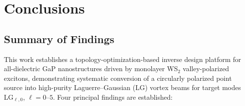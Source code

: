 \chapter{Conclusions}
\label{ch:conclusion}


\section{Summary of Findings}
\label{sec:summary}

This work establishes a topology-optimization-based inverse design platform for all-dielectric GaP nanostructures driven by monolayer WS$_2$ valley-polarized excitons, demonstrating systematic conversion of a circularly polarized point source into high-purity Laguerre--Gaussian (LG)
vortex beams for target modes LG$_{\ell,0}$, $\ell = 0$--$5$. Four principal findings are established:

